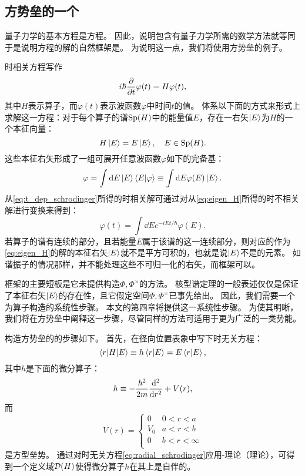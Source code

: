 \subsection{方势垒的一个\rhs}

量子力学的基本方程是\schrodinger 方程。
因此，说明\RHS 包含有量子力学所需的数学方法就等同于是说明\schrodinger 方程的解的自然框架是\RHS 。
为说明这一点，我们将使用方势垒的例子。%

时相关\schrodinger 方程写作
\[\label{eq:t_dep_schrodinger}
	i\hbar\pdo{t}\varphi(t)=H\varphi(t),\]
其中\(H\)表示\hamilton 算子，而\(\varphi(t)\)表示波函数\(\varphi\)中时间\(t\)的值。
\dirac 体系以下面的方式来形式上求解这一方程：对于每个\hamilton 算子的谱\(\sp(H)\)中的能量值\(E\)，存在一右矢\(\ket E\)为\(H\)的一个本征向量：
\[\label{eq:eigen_H}
	H\ket E=E\ket E,\quad E\in\sp(H).\]
这些本征右矢形成了一组可展开任意波函数\(\varphi\)如下的完备基：
\[\varphi=\int\dd E\ket E\braket{E|\varphi}\defaseq\int\dd E\varphi(E)\ket E.\]
从\cref{eq:t_dep_schrodinger}所得的时相关解可通过对从\cref{eq:eigen_H}所得的时不相关解进行\fourier 变换来得到：
\[\varphi(t)=\int\dd Ee^{-iEt/\hbar}\varphi(E).\]
若\hamilton 算子的谱有连续的部分，且若能量\(E\)属于该谱的这一连续部分，则对应的作为\cref{eq:eigen_H}的解的本征右矢\(\ket E\)就不是平方可积的，也就是说\(\ket E\)不是\hs 的元素。
如谐振子的情况那样，\hs 并不能处理这些不可归一化的右矢，而\RHS 框架可以。

\RHS 框架的主要短板是它未提供构造\(\Phi,\Phi^\times\)的方法。
核型谱定理的一般表述仅仅是保证了本征右矢\(\ket E\)的存在性，且它假定空间\(\Phi,\Phi^\times\)已事先给出。%
因此，我们需要一个为\schrodinger\hamilton 算子构造\RHS 的系统性步骤。
本文的第四章将提供这一系统性步骤。%
为使其明晰，我们将在方势垒中阐释这一步骤，尽管同样的方法可适用于更为广泛的一类势能。

构造方势垒的\RHS 的步骤如下。
首先，在径向位置表象中写下时无关\schrodinger 方程：
\[\label{eq:radial_schrodinger}
	\braket{r|H|E}\equiv h\braket{r|E}=E\braket{r|E},\]
其中\(h\)是下面的\schrodinger 微分算子：
\[h\defaseq-\frac{\hbar^2}{2m}\frac{\dd^2}{\dd r^2}+V(r),\]
而
\[V(r)=\begin{cases}
	0&0<r<a\\
	V_0&a<r<b\\
	0&b<r<\infty\\
\end{cases}\]
是方型垒势。
通过对时无关\schrodinger 方程\cref{eq:radial_schrodinger}应用-理论（\weyl 理论），可得到一个定义域\(\cD(H)\)使得微分算子\(h\)在其上是自伴的。%
